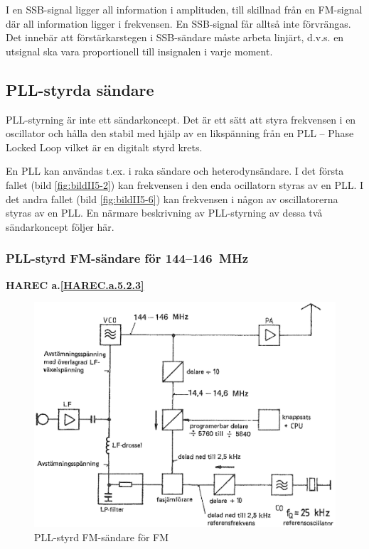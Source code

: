 I en SSB-signal ligger all information i amplituden, till skillnad
från en FM-signal där all information ligger i frekvensen. En
SSB-signal får alltså inte förvrängas. Det innebär att
förstärkarstegen i SSB-sändare måste arbeta linjärt, d.v.s. en
utsignal ska vara proportionell till insignalen i varje moment.

\subsection{PLL-styrda sändare}

PLL-styrning är inte ett sändarkoncept. Det är ett sätt att styra
frekvensen i en oscillator och hålla den stabil med hjälp av en
likspänning från en PLL -- Phase Locked Loop vilket är en digitalt
styrd krets.

En PLL kan användas t.ex. i raka sändare och heterodynsändare. I det
första fallet (bild \ref{fig:bildII5-2}) kan frekvensen i den enda ocillatorn
styras av en PLL. I det andra fallet (bild \ref{fig:bildII5-6}) kan frekvensen i
någon av oscillatorerna styras av en PLL.  En närmare beskrivning av
PLL-styrning av dessa två sändarkoncept följer här.

\subsubsection{PLL-styrd FM-sändare för 144--146~MHz}
\textbf{
HAREC a.\ref{HAREC.a.5.2.3}\label{myHAREC.a.5.2.3}
}

\begin{figure}
  \includegraphics[width=\textwidth]{images/cropped_pdfs/bild_2_5-07.pdf}
  \caption{PLL-styrd FM-sändare för FM}
  \label{fig:bildII5-7}
\end{figure}

